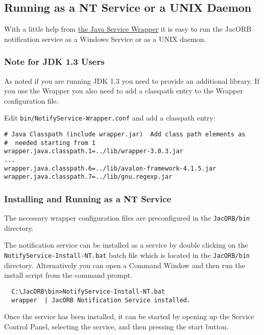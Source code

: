 \subsection{Running as a NT Service or a UNIX Daemon}
\label{sec:runn-notif-serv-1}

With a little help from
\href{http://wrapper.tanukisoftware.org}{the Java Service Wrapper} it is
easy to run the JacORB notification service as a Windows Service or as
a UNIX daemon. 


\subsubsection{Note for JDK 1.3 Users}
\label{sec:ntfy-jdk1.3}

As noted if you are running JDK 1.3 you need to provide an
additional library. If you use the Wrapper you also need to add a
classpath entry to the Wrapper configuration file.

Edit \texttt{bin/NotifyService-Wrapper.conf} and add a classpath
entry:

\begin{verbatim}
# Java Classpath (include wrapper.jar)  Add class path elements as
#  needed starting from 1
wrapper.java.classpath.1=../lib/wrapper-3.0.3.jar
...
wrapper.java.classpath.6=../lib/avalon-framework-4.1.5.jar
wrapper.java.classpath.7=../lib/gnu.regexp.jar
\end{verbatim}

\subsubsection{Installing and Running as a NT Service}
\label{sec:windows-service}

The necessary wrapper configuration files are preconfigured in the
\texttt{JacORB/bin} directory. 

The notification service can be installed as a service by double
clicking on the \texttt{NotifyService-Install-NT.bat} batch file which
is located in the \texttt{JacORB/bin} directory.
Alternatively you can open a Command Window and then run the install
script from the command prompt. 

\begin{verbatim}
  C:\JacORB\bin>NotifyService-Install-NT.bat
  wrapper  | JacORB Notification Service installed.
\end{verbatim}

Once the service has been installed, it can be started by opening up
the Service Control Panel, selecting the service, and then pressing
the start button.

